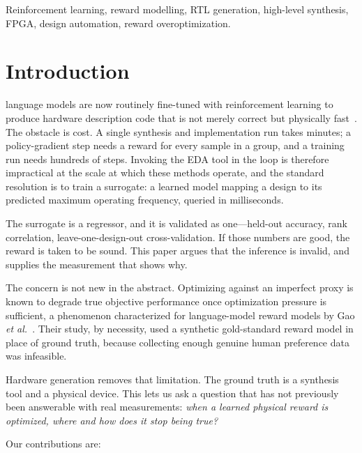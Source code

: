 \documentclass[journal]{IEEEtran}
\begin{document}
\begin{IEEEkeywords}
Reinforcement learning, reward modelling, RTL generation, high-level synthesis,
FPGA, design automation, reward overoptimization.
\end{IEEEkeywords}

\section{Introduction}

 language models are now routinely fine-tuned with
reinforcement learning to produce hardware description code that is not merely
correct but physically fast~\cite{chipseek2025,ppartl2025}. The obstacle is
cost. A single synthesis and implementation run takes minutes; a policy-gradient
step needs a reward for every sample in a group, and a training run needs
hundreds of steps. Invoking the EDA tool in the loop is therefore impractical at
the scale at which these methods operate, and the standard resolution is to
train a surrogate: a learned model mapping a design to its predicted maximum
operating frequency, queried in milliseconds.

The surrogate is a regressor, and it is validated as one---held-out
accuracy, rank correlation, leave-one-design-out cross-validation. If those
numbers are good, the reward is taken to be sound. This paper argues that the
inference is invalid, and supplies the measurement that shows why.

The concern is not new in the abstract. Optimizing against an imperfect proxy is
known to degrade true objective performance once optimization pressure is
sufficient, a phenomenon characterized for language-model reward models by
Gao \emph{et al.}~\cite{gao2023scaling}. Their study, by necessity, used a
synthetic gold-standard reward model in place of ground truth, because
collecting enough genuine human preference data was infeasible.

Hardware generation removes that limitation. The ground truth is a synthesis
tool and a physical device. This lets us ask a question that has not previously
been answerable with real measurements: \emph{when a learned physical reward is
optimized, where and how does it stop being true?}

Our contributions are:
\end{document}
